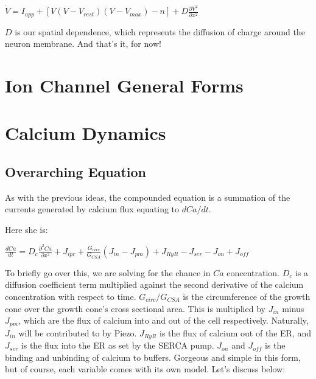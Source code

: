 \documentclass[12pt]{amsart}
\begin{document}
\bigskip

\begin{center}

    $\dot{V} = I_{app} + [V(V - V_{rest})(V - V_{max}) - n] +  D\frac{\partial V^2}{\partial x^2}$\\
    
\end{center}

\bigskip

$D$ is our spatial dependence, which represents the diffusion of charge around the neuron membrane. And that's it, for now! 

\section{Ion Channel General Forms}

\section{Calcium Dynamics}

\subsection{Overarching Equation} As with the previous ideas, the compounded equation is a summation of the currents generated by calcium flux equating to $dCa / dt$.\newline

Here she is: 

\begin{center}

    $\frac{dCa}{dt} = D_c\frac{\partial^2 Ca}{\partial x^2} + J_{ipr} + \frac{G_{circ}}{G_{CSA}}(J_{in} - J_{pm}) + J_{RyR} - J_{ser} - J_{on} + J_{off}$

\end{center}

\bigskip

To briefly go over this, we are solving for the chance in $Ca$ concentration. $D_c$ is a diffusion coefficient term multiplied against the second derivative of the calcium concentration with respect to time. $G_{circ} / G_{CSA}$ is the circumference of the growth cone over the growth cone's cross sectional area. This is multiplied by $J_{in}$ minus $J_{pm}$, which are the flux of calcium into and out of the cell respectively. Naturally, $J_{in}$ will be contributed to by Piezo. $J_{RyR}$ is the flux of calcium out of the ER, and $J_{ser}$ is the flux into the ER as set by the SERCA pump. $J_{on}$ and $J_{off}$ is the binding and unbinding of calcium to buffers. Gorgeous and simple in this form, but of course, each variable comes with its own model. Let's discuss below: 
\end{document}
